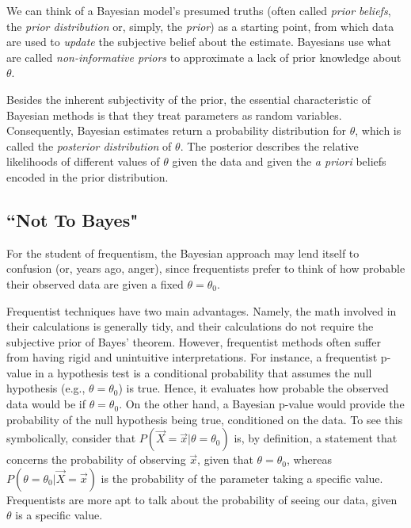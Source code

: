\documentclass[12pt,twoside]{reedthesis}
\begin{document}
	We can think of a Bayesian model's presumed truths (often called {\em prior beliefs}, the {\em prior distribution} or, simply, the {\em prior}) as a starting point, from which data are used to {\em update} the subjective belief about the estimate.  Bayesians use what are called {\em non-informative priors} to approximate a lack of prior knowledge about $\theta$. 
	
	Besides the inherent subjectivity of the prior, the essential characteristic of Bayesian methods is that they treat parameters as random variables. Consequently, Bayesian estimates return a probability distribution for $\theta$, which is called the {\em posterior distribution} of $\theta$. The posterior describes the relative likelihoods of different values of $\theta$ given the data and given the {\em a priori} beliefs encoded in the prior distribution.

	\subsection*{``Not To Bayes"}
	For the student of frequentism, the Bayesian approach may lend itself to confusion (or, years ago, anger), since frequentists prefer to think of how probable their observed data are given a fixed $\theta = \theta_0$.
	
	Frequentist techniques have two main advantages. Namely, the math involved in their calculations is generally tidy, and their calculations do not require the subjective prior of Bayes' theorem. However, frequentist methods often suffer from having rigid and unintuitive interpretations. 
	For instance, a frequentist p-value in a hypothesis test is a conditional probability that assumes the null hypothesis (e.g., $\theta = \theta_0$) is true. Hence, it evaluates how probable the observed data would be if $\theta = \theta_0$. On the other hand, a Bayesian p-value would provide the probability of the null hypothesis being true, conditioned on the data. 
	To see this symbolically, consider that $P(\vec{X} = \vec{x} | \theta = \theta_0 )$ is, by definition, a statement that concerns the probability of observing $\vec{x}$, given that $\theta = \theta_0$, whereas $P(\theta = \theta_0 | \vec{X} = \vec{x})$ is the probability of the parameter taking a specific value. Frequentists are more apt to talk about the probability of seeing our data, given $\theta$ is a specific value.
\end{document}
